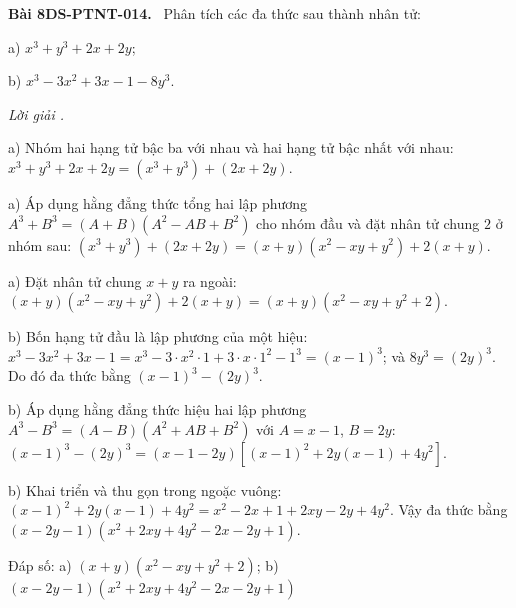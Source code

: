 \documentclass[12pt,a4paper]{article}
\newenvironment{problem}[1][]{\par\medskip\noindent\textbf{Bài #1.}\ }{\par}
\newenvironment{solution}[1][]{\par\noindent\textit{Lời giải #1.}\par}{\par}
\begin{document}
\begin{problem}[8DS-PTNT-014]
Phân tích các đa thức sau thành nhân tử:

a) $x^3 + y^3 + 2x + 2y$;

b) $x^3 - 3x^2 + 3x - 1 - 8y^3$.

\begin{solution}
a) Nhóm hai hạng tử bậc ba với nhau và hai hạng tử bậc nhất với nhau: $x^3 + y^3 + 2x + 2y = (x^3 + y^3) + (2x + 2y)$.

a) Áp dụng hằng đẳng thức tổng hai lập phương $A^3 + B^3 = (A + B)(A^2 - AB + B^2)$ cho nhóm đầu và đặt nhân tử chung $2$ ở nhóm sau: $(x^3 + y^3) + (2x + 2y) = (x + y)(x^2 - xy + y^2) + 2(x + y)$.

a) Đặt nhân tử chung $x + y$ ra ngoài: $(x + y)(x^2 - xy + y^2) + 2(x + y) = (x + y)(x^2 - xy + y^2 + 2)$.

b) Bốn hạng tử đầu là lập phương của một hiệu: $x^3 - 3x^2 + 3x - 1 = x^3 - 3 \cdot x^2 \cdot 1 + 3 \cdot x \cdot 1^2 - 1^3 = (x - 1)^3$; và $8y^3 = (2y)^3$. Do đó đa thức bằng $(x - 1)^3 - (2y)^3$.

b) Áp dụng hằng đẳng thức hiệu hai lập phương $A^3 - B^3 = (A - B)(A^2 + AB + B^2)$ với $A = x - 1$, $B = 2y$: $(x - 1)^3 - (2y)^3 = (x - 1 - 2y)\left[(x - 1)^2 + 2y(x - 1) + 4y^2\right]$.

b) Khai triển và thu gọn trong ngoặc vuông: $(x - 1)^2 + 2y(x - 1) + 4y^2 = x^2 - 2x + 1 + 2xy - 2y + 4y^2$. Vậy đa thức bằng $(x - 2y - 1)(x^2 + 2xy + 4y^2 - 2x - 2y + 1)$.

Đáp số: a) $\boxed{(x + y)(x^2 - xy + y^2 + 2)}$; b) $\boxed{(x - 2y - 1)(x^2 + 2xy + 4y^2 - 2x - 2y + 1)}$
\end{solution}
\end{problem}
\end{document}
